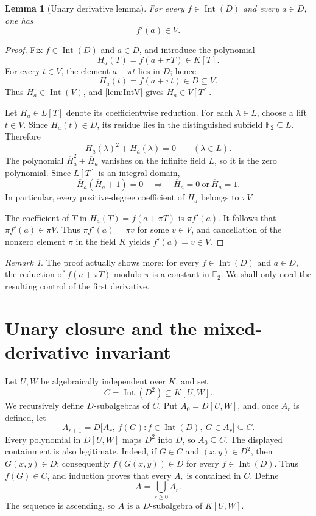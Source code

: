 \documentclass[11pt,reqno]{amsart}
\numberwithin{equation}{section}
\theoremstyle{plain}
\newtheorem{lemma}[theorem]{Lemma}
\theoremstyle{definition}
\theoremstyle{remark}
\newtheorem{remark}[theorem]{Remark}
\newcommand{\Int}{\operatorname{Int}}
\newcommand{\F}{\mathbb F}
\begin{document}
\begin{lemma}[Unary derivative lemma]\label{lem:derivative}
For every \(f\in\Int(D)\) and every \(a\in D\), one has
\[
 f'(a)\in V.
\]
\end{lemma}

\begin{proof}
Fix \(f\in\Int(D)\) and \(a\in D\), and introduce the polynomial
\[
 H_a(T)=f(a+\pi T)\in K[T].
\]
For every \(t\in V\), the element \(a+\pi t\) lies in \(D\); hence
\[
 H_a(t)=f(a+\pi t)\in D\subseteq V.
\]
Thus \(H_a\in\Int(V)\), and \cref{lem:IntV} gives
\(H_a\in V[T]\).

Let \(\overline H_a\in L[T]\) denote its coefficientwise reduction.
For each \(\lambda\in L\), choose a lift \(t\in V\).  Since
\(H_a(t)\in D\), its residue lies in the distinguished subfield
\(\F _2\subseteq L\).  Therefore
\[
 \overline H_a(\lambda)^2+\overline H_a(\lambda)=0
 \qquad(\lambda\in L).
\]
The polynomial \(\overline H_a^2+\overline H_a\) vanishes on the
infinite field \(L\), so it is the zero polynomial.  Since \(L[T]\) is
an integral domain,
\[
 \overline H_a(\overline H_a+1)=0
 \quad\Longrightarrow\quad
 \overline H_a=0\ \text{or}\ \overline H_a=1.
\]
In particular, every positive-degree coefficient of \(H_a\) belongs to
\(\pi V\).

The coefficient of \(T\) in \(H_a(T)=f(a+\pi T)\) is
\(\pi f'(a)\).  It follows that \(\pi f'(a)\in\pi V\).  Thus
\(\pi f'(a)=\pi v\) for some \(v\in V\), and cancellation of the
nonzero element \(\pi\) in the field \(K\) yields \(f'(a)=v\in V\).
\end{proof}

\begin{remark}\label{rem:constant-reduction}
The proof actually shows more: for every \(f\in\Int(D)\) and
\(a\in D\), the reduction of \(f(a+\pi T)\) modulo \(\pi\) is a
constant in \(\F _2\).  We shall only need the resulting control of the
first derivative.
\end{remark}

\section{Unary closure and the mixed-derivative invariant}
\label{sec:closure}

Let \(U,W\) be algebraically independent over \(K\), and set
\[
 C=\Int(D^2)\subseteq K[U,W].
\]
We recursively define \(D\)-subalgebras of \(C\).  Put
\(A_0=D[U,W]\), and, once \(A_r\) is defined, let
\begin{equation}
 A_{r+1}
  =D\big[A_r,\ f(G):f\in\Int(D),\ G\in A_r\big]\subseteq C.
 \label{eq:Ar}
\end{equation}
Every polynomial in \(D[U,W]\) maps \(D^2\) into \(D\), so
\(A_0\subseteq C\).  The displayed containment is also legitimate.
Indeed, if \(G\in C\) and
\((x,y)\in D^2\), then \(G(x,y)\in D\); consequently
\(f(G(x,y))\in D\) for every \(f\in\Int(D)\).  Thus \(f(G)\in C\),
and induction proves that every \(A_r\) is contained in \(C\).  Define
\begin{equation}
 A=\bigcup_{r\geq0}A_r.
 \label{eq:A}
\end{equation}
The sequence is ascending, so \(A\) is a \(D\)-subalgebra of
\(K[U,W]\).
\end{document}
